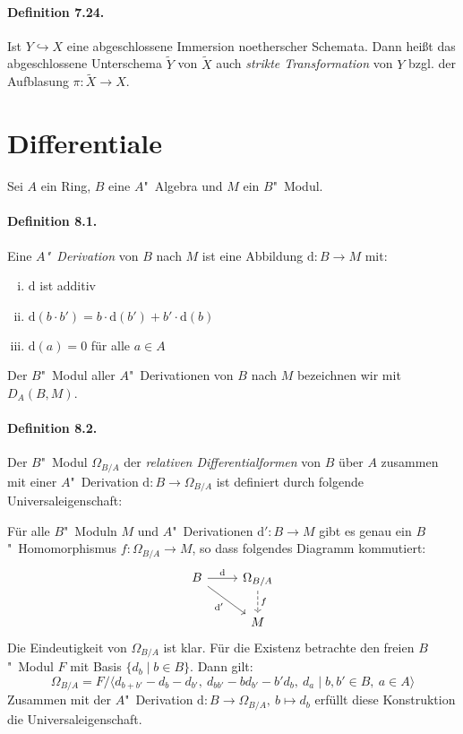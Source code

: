 \documentclass[11pt,b5paper,openany]{memoir}
\begin{document}
\paragraph{Definition 7.24.}\label{7.24} Ist $Y\hookrightarrow X$ eine abgeschlossene Immersion noetherscher Schemata. Dann heißt das abgeschlossene Unterschema $\widetilde{Y}$ von $\widetilde{X}$ auch \textit{strikte Transformation} von $Y$ bzgl. der Aufblasung $\pi:\widetilde{X}\to X$.

\section{Differentiale}

Sei $A$ ein Ring, $B$ eine $A$"~Algebra und $M$ ein $B$"~Modul.

\paragraph{Definition 8.1.}\label{8.1} Eine \textit{$A$"~Derivation} von $B$ nach $M$ ist eine Abbildung $\mathrm{d}:B\to M$ mit:
\begin{enumerate}[(i)]
\item $\mathrm{d}$ ist additiv
\item $\mathrm{d}(b\cdot b')=b\cdot \mathrm{d}(b')+ b'\cdot \mathrm{d}(b)$
\item $\mathrm{d}(a)=0$ für alle $a\in A$
\end{enumerate}
Der $B$"~Modul aller $A$"~Derivationen von $B$ nach $M$ bezeichnen wir mit $D_A(B,M)$.

\paragraph{Definition 8.2.}\label{8.2} Der $B$"~Modul $\Omega_{B/A}$ der \textit{relativen Differentialformen} von $B$ über $A$ zusammen mit einer $A$"~Derivation $\mathrm{d}:B\to\Omega_{B/A}$ ist definiert durch folgende Universaleigenschaft:

Für alle $B$"~Moduln $M$ und $A$"~Derivationen $\mathrm{d}':B\to M$ gibt es genau ein $B$"~Ho\-mo\-mor\-phis\-mus $f:\Omega_{B/A}\to M$, so dass folgendes Diagramm kommutiert:
\[\begin{tikzcd}
B\ar[r, "\mathrm{d}"]\ar[rd, "\mathrm{d}'"'] & \Omega_{B/A}\ar[d, "f", dashed]\\
& M
\end{tikzcd}\]
Die Eindeutigkeit von $\Omega_{B/A}$ ist klar. Für die Existenz betrachte den freien $B$"~Modul $F$ mit Basis $\{d_b\mid b\in B\}$. Dann gilt:
\[\Omega_{B/A}=F / \langle d_{b+b'}-d_b-d_{b'},\ d_{bb'}-bd_{b'}-b'd_b,\ d_a\mid b,b'\in B,\ a\in A\rangle \]
Zusammen mit der $A$"~Derivation $\mathrm{d}:B\to\Omega_{B/A},\ b\mapsto d_b$ erfüllt diese Konstruktion die Universaleigenschaft.
\end{document}
